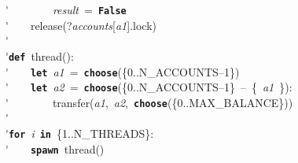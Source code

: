\'\>~~~~~~~~\textit{result}~=~\texttt{\textbf{False}}\\

\'\>~~~~release(?\textit{accounts}[\textit{a1}].lock)\\

\'\>\\

\'\>\texttt{\textbf{def}}~thread():\\

\'\>~~~~\texttt{\textbf{let}}~\textit{a1}~=~\texttt{\textbf{choose}}(\{0..N\_ACCOUNTS--1\})\\

\'\>~~~~\texttt{\textbf{let}}~\textit{a2}~=~\texttt{\textbf{choose}}(\{0..N\_ACCOUNTS--1\}~--~\{~\textit{a1}~\}):\\

\'\>~~~~~~~~transfer(\textit{a1},~\textit{a2},~\texttt{\textbf{choose}}(\{0..MAX\_BALANCE\}))\\

\'\>\\

\'\>\texttt{\textbf{for}}~\textit{i}~\texttt{\textbf{in}}~\{1..N\_THREADS\}:\\

\'\>~~~~\texttt{\textbf{spawn}}~thread()